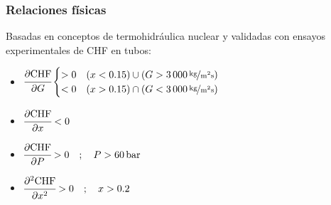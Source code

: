 \documentclass{beamer}
\begin{document}
\begin{frame}
    \frametitle{Relaciones físicas}
    Basadas en conceptos de termohidráulica nuclear y validadas con ensayos experimentales de CHF en tubos:
    \vspace{0.5cm}
    \begin{itemize}
        \item $\cfrac{\partial \mathrm{CHF}}{\partial G}\begin{cases} > 0 & (x < 0.15) \cup ( G > 3\,000\,\nicefrac{\mathrm{kg}}{\mathrm{m}^2\mathrm{s}}) \\ < 0 & (x > 0.15) \cap ( G < 3\,000\,\nicefrac{\mathrm{kg}}{\mathrm{m}^2\mathrm{s}}) \end{cases}$
        \item $\cfrac{\partial \mathrm{CHF}}{\partial x} < 0$
        \item $\cfrac{\partial \mathrm{CHF}}{\partial P} > 0 \quad ; \quad P>60\,\mathrm{bar}$
        \item $\cfrac{\partial^2 \mathrm{CHF}}{\partial x^2} > 0 \quad ; \quad x > 0.2$
    \end{itemize}


\end{frame}
\end{document}
